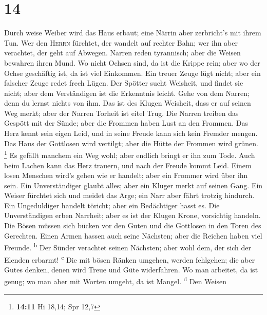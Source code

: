 \hypertarget{section-13}{%
\section{14}\label{section-13}}

 Durch weise Weiber wird das Haus erbaut; eine Närrin aber
zerbricht's mit ihrem Tun.  Wer den \textsc{Herrn}
fürchtet, der wandelt auf rechter Bahn; wer ihn aber verachtet, der geht
auf Abwegen.  Narren reden tyrannisch; aber die Weisen
bewahren ihren Mund.  Wo nicht Ochsen sind, da ist die
Krippe rein; aber wo der Ochse geschäftig ist, da ist viel Einkommen.
 Ein treuer Zeuge lügt nicht; aber ein falscher Zeuge
redet frech Lügen.  Der Spötter sucht Weisheit, und findet
sie nicht; aber dem Verständigen ist die Erkenntnis leicht.
 Gehe von dem Narren; denn du lernst nichts von ihm.
 Das ist des Klugen Weisheit, dass er auf seinen Weg
merkt; aber der Narren Torheit ist eitel Trug.  Die Narren
treiben das Gespött mit der Sünde; aber die Frommen haben Lust an den
Frommen.  Das Herz kennt sein eigen Leid, und in seine
Freude kann sich kein Fremder mengen.  Das Haus der
Gottlosen wird vertilgt; aber die Hütte der Frommen wird grünen.
\footnote{\textbf{14:11} Hi 18,14; Spr 12,7}  Es gefällt
manchem ein Weg wohl; aber endlich bringt er ihn zum Tode.
 Auch beim Lachen kann das Herz trauern, und nach der
Freude kommt Leid.  Einem losen Menschen wird's gehen wie
er handelt; aber ein Frommer wird über ihn sein.  Ein
Unverständiger glaubt alles; aber ein Kluger merkt auf seinen Gang.
 Ein Weiser fürchtet sich und meidet das Arge; ein Narr
aber fährt trotzig hindurch.  Ein Ungeduldiger handelt
töricht; aber ein Bedächtiger hasst es.  Die
Unverständigen erben Narrheit; aber es ist der Klugen Krone, vorsichtig
handeln.  Die Bösen müssen sich bücken vor den Guten und
die Gottlosen in den Toren des Gerechten.  Einen Armen
hassen auch seine Nächsten; aber die Reichen haben viel Freunde.
\textsuperscript{b}  Der Sünder verachtet seinen
Nächsten; aber wohl dem, der sich der Elenden erbarmt!
\textsuperscript{c}  Die mit bösen Ränken umgehen, werden
fehlgehen; die aber Gutes denken, denen wird Treue und Güte widerfahren.
 Wo man arbeitet, da ist genug; wo man aber mit Worten
umgeht, da ist Mangel. \textsuperscript{d}  Den Weisen
